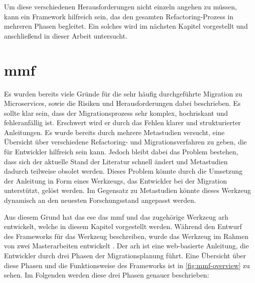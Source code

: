Um diese verschiedenen Herausforderungen nicht einzeln angehen zu müssen, kann ein Framework hilfreich sein, das den gesamten Refactoring-Prozess in mehreren Phasen begleitet.
Ein solches wird im nächsten Kapitel vorgestellt und anschließend in dieser Arbeit untersucht.

\section{\acrfull{mmf}}
\label{sec:mmf}

Es wurden bereits viele Gründe für die sehr häufig durchgeführte Migration zu Microservices, sowie die Risiken und Herausforderungen dabei beschrieben.
Es sollte klar sein, dass der Migrationsprozess sehr komplex, hochriskant und fehleranfällig ist.
Erschwert wird er durch das Fehlen klarer und strukturierter Anleitungen.
Es wurde bereits durch mehrere Metastudien versucht, eine Übersicht über verschiedene Refactoring- und Migrationsverfahren zu geben, die für Entwickler hilfreich sein kann.
Jedoch bleibt dabei das Problem bestehen, dass sich der aktuelle Stand der Literatur schnell ändert und Metastudien dadurch teilweise obsolet werden.
Dieses Problem könnte durch die Umsetzung der Anleitung in Form eines Werkzeugs, das Entwickler bei der Migration unterstützt, gelöst werden.
Im Gegensatz zu Metastudien könnte dieses Werkzeug dynamisch an den neuesten Forschungsstand angepasst werden.

Aus diesem Grund hat das \gls{ese} das \acrfull{mmf} und das zugehörige Werkzeug \gls{arh} \cite{arh-github} entwickelt, welche in diesem Kapitel vorgestellt werden.
Während  den Entwurf des Frameworks für das Werkzeug beschreiben, wurde das Werkzeug im Rahmen von zwei Masterarbeiten entwickelt \cite{master-daniel-koch,master-tobias-haller}.
Der \gls{arh} ist eine web-basierte Anleitung, die Entwickler durch drei Phasen der Migrationsplanung führt.
Eine Übersicht über diese Phasen und die Funktionsweise des Frameworks ist in \cref{fig:mmf-overview} zu sehen.
Im Folgenden werden diese drei Phasen genauer beschrieben:

